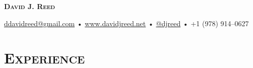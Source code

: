 \documentclass{article}
\begin{document}
\thispagestyle{empty}

\begin{center}
  {\LARGE\textsc{\textbf{David J. Reed}}}
\end{center}

\begin{center}
  \href{mailto:ddavidreed@gmail.com}{ddavidreed@gmail.com} • \href{https://www.davidjreed.net/}{www.davidjreed.net} • \href{https://github.com/djreed}{@djreed} • +1 (978) 914--0627 \\
  \hrulefill
\end{center}

\section*{\textsc{Experience}}
\end{document}
